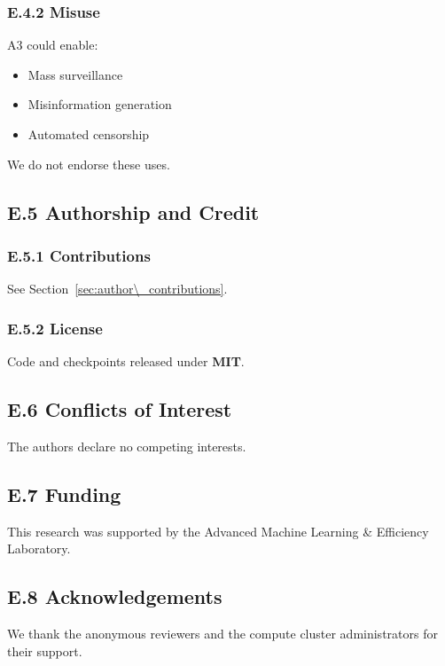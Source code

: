 \subsubsection{E.4.2 Misuse}

A3 could enable:

\begin{itemize}
\item Mass surveillance
\item Misinformation generation
\item Automated censorship

\end{itemize}
We do not endorse these uses.

\subsection{E.5 Authorship and Credit}

\subsubsection{E.5.1 Contributions}

See Section~\ref{sec:author\_contributions}.

\subsubsection{E.5.2 License}

Code and checkpoints released under \textbf{MIT}.

\subsection{E.6 Conflicts of Interest}

The authors declare no competing interests.

\subsection{E.7 Funding}

This research was supported by the Advanced Machine Learning \& Efficiency Laboratory.

\subsection{E.8 Acknowledgements}

We thank the anonymous reviewers and the compute cluster administrators for their support.

